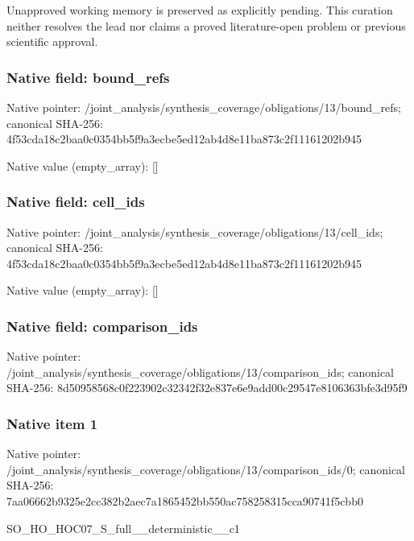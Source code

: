 \documentclass[10pt,a4paper]{article}
\begin{document}
\begingroup\raggedright\sloppy Unapproved working memory is preserved as explicitly pending. This curation neither resolves the lead nor claims a proved literature-open problem or previous scientific approval.\par\endgroup

\subsubsection{Native field: bound\_\allowbreak{}refs}
Native pointer: /joint\_\allowbreak{}analysis/synthesis\_\allowbreak{}coverage/obligations/13/bound\_\allowbreak{}refs; canonical SHA-256: 4f53cda18c2baa0c0354bb5f9a3ecbe5ed12ab4d8e11ba873c2f11161202b945

Native value (empty\_\allowbreak{}array): []

\subsubsection{Native field: cell\_\allowbreak{}ids}
Native pointer: /joint\_\allowbreak{}analysis/synthesis\_\allowbreak{}coverage/obligations/13/cell\_\allowbreak{}ids; canonical SHA-256: 4f53cda18c2baa0c0354bb5f9a3ecbe5ed12ab4d8e11ba873c2f11161202b945

Native value (empty\_\allowbreak{}array): []

\subsubsection{Native field: comparison\_\allowbreak{}ids}
Native pointer: /joint\_\allowbreak{}analysis/synthesis\_\allowbreak{}coverage/obligations/13/comparison\_\allowbreak{}ids; canonical SHA-256: 8d50958568c0f223902c32342f32e837e6e9add00c29547e8106363bfe3d95f9

\subsubsection{Native item 1}
Native pointer: /joint\_\allowbreak{}analysis/synthesis\_\allowbreak{}coverage/obligations/13/comparison\_\allowbreak{}ids/0; canonical SHA-256: 7aa06662b9325e2cc382b2aec7a1865452bb550ac758258315cca90741f5cbb0

\begingroup\raggedright\sloppy SO\_\allowbreak{}HO\_\allowbreak{}HOC07\_\allowbreak{}S\_\allowbreak{}full\_\allowbreak{}\_\allowbreak{}deterministic\_\allowbreak{}\_\allowbreak{}c1\par\endgroup
\end{document}
